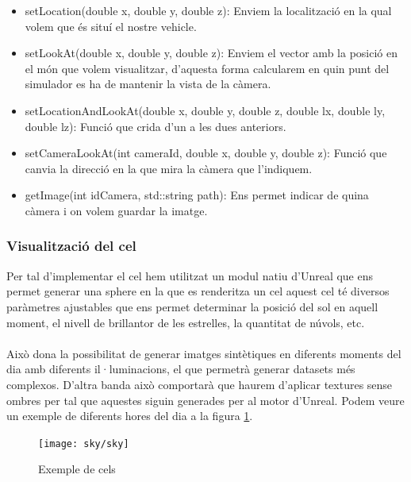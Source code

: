 \documentclass[10pt,a4paper,twocolumn,twoside]{article}
\begin{document}
\begin{itemize}
\item setLocation(double x, double y, double z): Enviem la localització en la qual volem que és situí el nostre vehicle.

\item setLookAt(double x, double y, double z): Enviem el vector amb la posició en el món que volem visualitzar, d'aquesta forma calcularem en quin punt del simulador es ha de mantenir la vista de la càmera.

\item setLocationAndLookAt(double x, double y, double z, double lx, double ly, double lz): Funció que crida d'un a les dues anteriors.

\item setCameraLookAt(int cameraId, double x, double y, double z): Funció que canvia la direcció en la que mira la càmera que l'indiquem.

\item getImage(int idCamera, std::string path): Ens permet indicar de quina càmera i on volem guardar la imatge.
\end{itemize}

\subsubsection{Visualització del cel}
Per tal d'implementar el cel hem utilitzat un modul natiu d'Unreal que ens permet generar una sphere en la que es renderitza un cel aquest cel té diversos paràmetres ajustables que ens permet determinar la posició del sol en aquell moment, el nivell de brillantor de les estrelles, la quantitat de núvols, etc. 
\\\\
Això dona la possibilitat de generar imatges sintètiques en diferents moments del dia amb diferents il·luminacions, el que permetrà generar datasets més complexos. D'altra banda això comportarà que haurem d'aplicar textures sense ombres per tal que aquestes siguin generades per al motor d'Unreal. Podem veure un exemple de diferents hores del dia a la figura \ref{fig-sky}.

\begin{figure}[!h]
\centering
  	\texttt{[image: sky/sky]}
	\caption{Exemple de cels}
	\label{fig-sky}
\end{figure}
\end{document}

